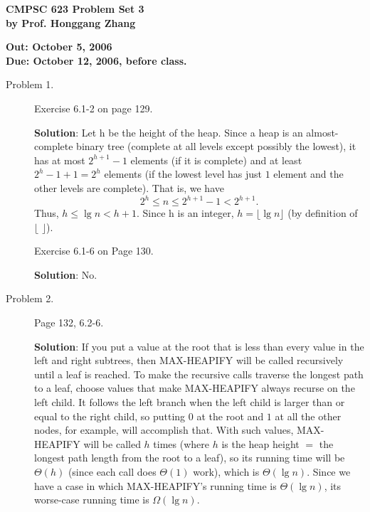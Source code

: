 \documentclass[11pt]{article}
\begin{document}

\begin{center}
{\bf CMPSC 623 Problem Set 3} \\
{\bf by Prof. Honggang Zhang} \\
\end{center}
\begin{center}
{\bf Out: October 5, 2006} \\
{\bf Due: October 12, 2006, before class.} \\

\end{center}


\begin{description}

\item[Problem 1.]
Exercise 6.1-2 on page 129.

\noindent \textbf{Solution}: Let h be the height of the heap.
Since a heap is an almost-complete binary tree (complete at all
levels except possibly the lowest), it has at most $2^{h+1}-1$
elements (if it is complete) and at least $2^h-1+1=2^h$ elements
(if the lowest level has just $1$ element and the other levels are
complete). That is, we have
$$
2^h \le n \le 2^{h+1}-1 < 2^{h+1}.
$$
Thus, $h\le \lg n < h+1$. Since h is an integer, $h=\lfloor \lg n
\rfloor $ (by definition of $\lfloor$ $\rfloor$).


Exercise 6.1-6 on Page 130.

\noindent \textbf{Solution}: No.




\item[Problem 2.]
Page 132, 6.2-6.

\noindent \textbf{Solution}: If you put a value at the root that
is less than every value in the left and right subtrees, then
MAX-HEAPIFY will be called recursively until a leaf is reached. To
make the recursive calls traverse the longest path to a leaf,
choose values that make MAX-HEAPIFY always recurse on the left
child. It follows the left branch  when the left child is larger
than or equal to the right child, so putting $0$ at the root and
$1$ at all the other nodes, for example, will accomplish that.
With such values, MAX-HEAPIFY will be called $h$ times (where $h$
is the heap height $=$ the longest path length from the root to a
leaf), so its running time will be $\Theta(h)$ (since each call
does $\Theta(1)$ work), which is $\Theta(\lg n)$. Since we have a
case in which MAX-HEAPIFY's running time is $\Theta(\lg n)$, its
worse-case running time is $\Omega(\lg n)$.



\end{description}
\end{document}
